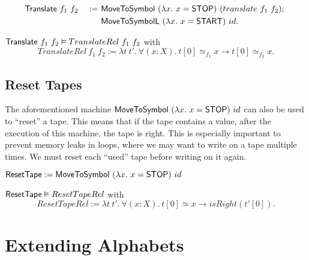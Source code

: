 \begin{definition}[$\MS{Translate}$]
  ~
  \begin{alignat*}{2}
    & \mathsf{Translate}~f_1~f_2 &~:=~& \mathsf{MoveToSymbol}~(\lambda x.~x=\mathsf{STOP})~(translate~f_1~f_2) ;~ \\
    &                        &~  ~& \mathsf{MoveToSymbolL}~(\lambda x.~x=\mathsf{START})~id.
  \end{alignat*}
\end{definition}

\begin{lemma}
  $\mathsf{Translate}~f_1~f_2 \mathrel{\vDash} TranslateRel~f_1~f_2$ with
  \[
    TranslateRel~f_1~f_2 := \lambda t~t'.~\forall(x:X).~t[0] \simeq_{f_1} x \rightarrow t[0] \simeq_{f_2} x.
  \]
\end{lemma}


\subsection{Reset Tapes}
\label{sec:reset-tape}

The aforementioned machine $\mathsf{MoveToSymbol}~(\lambda x.~x=\mathsf{STOP})~id$ can also be used to ``reset'' a tape.  This means that if the tape contains
a value, after the execution of this machine, the tape is right.  This is especially important to prevent memory leaks in loops, where we may want to
write on a tape multiple times.  We must reset each ``used'' tape before writing on it again.

\begin{definition}[$\MS{ResetTape}$]
  \label{def:Reset}
  $\mathsf{ResetTape} := \mathsf{MoveToSymbol}~(\lambda x.~x=\mathsf{STOP})~id$
\end{definition}

\begin{lemma}
  \label{lem:Reset_Realise}
  $\mathsf{ResetTape} \mathrel{\vDash} ResetTapeRel$ with
  \[
    ResetTapeRel := \lambda t~t'.~\forall(x:X).~t[0] \simeq x \rightarrow isRight(t'[0]).
  \]
\end{lemma}


\section{Extending Alphabets}
\label{sec:extend-alphabet}

